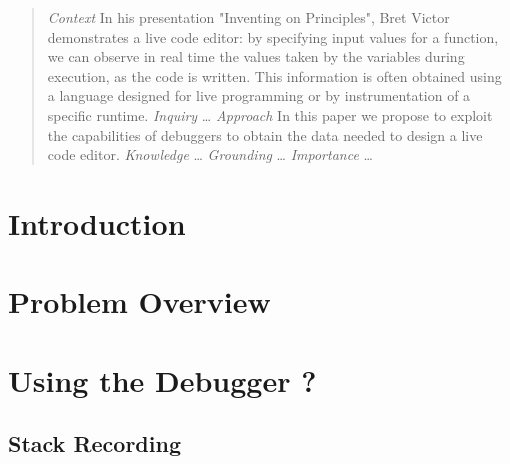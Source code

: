 \documentclass[english,submission]{programming}
\begin{document}
\begin{abstract}
  \emph{Context}
  In his presentation "Inventing on Principles", Bret Victor demonstrates a live code editor: by specifying input values for a function, we can observe in real time the values taken by the variables during execution, as the code is written. 
  This information is often obtained using a language designed for live programming or by instrumentation of a specific runtime.
  \emph{Inquiry}
  \dots
  \emph{Approach}
  In this paper we propose to exploit the capabilities of debuggers to obtain the data needed to design a live code editor.
  \emph{Knowledge}
  \dots
  \emph{Grounding}
  \dots
  \emph{Importance}
  \dots
 
\end{abstract}
\section{Introduction}
\label{sec:introduction}

\section{Problem Overview}
\label{sec:problem-overview}

\section{Using the Debugger ?}
\label{sec:stack-recording}

\subsection{Stack Recording}
\end{document}
